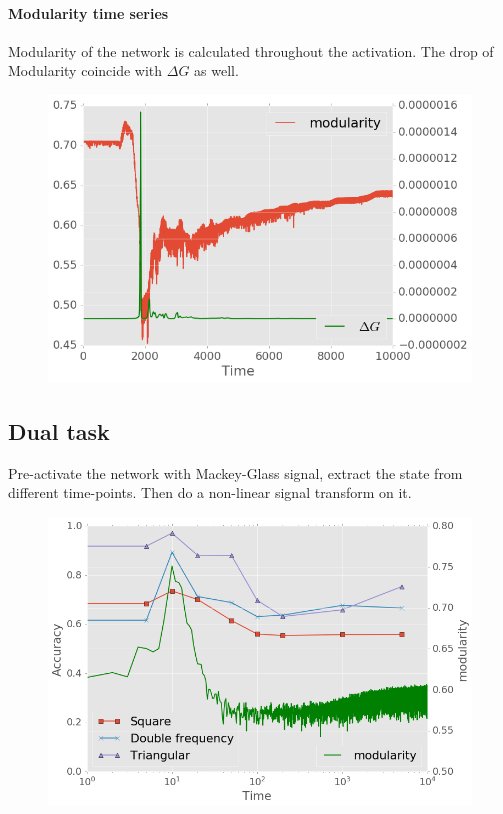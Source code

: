 \documentclass[%
 reprint,
 amsmath,amssymb,
 aps,
]{revtex4-2}
\begin{document}
\paragraph{Modularity time series}

Modularity of the network is calculated throughout the activation. The drop of Modularity coincide with $\Delta G$ as well. 

\begin{figure}[h]
	\centering
	\includegraphics[width=1\linewidth]{figure/mod_dG}
	\caption{}
	\label{fig:mod_dg}
\end{figure}

\subsection{Dual task}

Pre-activate the network with Mackey-Glass signal, extract the state from different time-points. Then do a non-linear signal transform on it.

\begin{figure}[h]
	\centering
	\includegraphics[width=1\linewidth]{figure/dual_task}
	\caption{}
	\label{fig:dual_task}
\end{figure}
\end{document}
